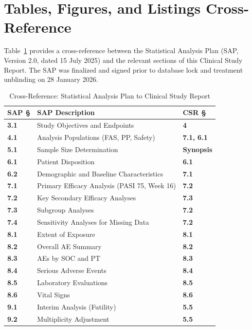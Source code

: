 \section{Tables, Figures, and Listings Cross-Reference}
\label{sec:saper}

Table~\ref{tab:saper} provides a cross-reference between the Statistical Analysis Plan (SAP, Version 2.0, dated 15 July 2025) and the relevant sections of this Clinical Study Report. The SAP was finalized and signed prior to database lock and treatment unblinding on 28 January 2026.

\vspace{4pt}
\begin{table}[H]
\centering
\caption{Cross-Reference: Statistical Analysis Plan to Clinical Study Report}
\label{tab:saper}
\small
\begin{tabularx}{\linewidth}{@{}>{\color{accent}\bfseries}l@{\hspace{6mm}}>{\raggedright\arraybackslash}X@{\hspace{6mm}}>{\bfseries}l@{}}
\toprule
\textbf{SAP \S} & \textbf{SAP Description} & \textbf{CSR \S} \\
\midrule
3.1   & Study Objectives and Endpoints             & 4 \\
4.1   & Analysis Populations (FAS, PP, Safety)     & 7.1, 6.1 \\
5.1   & Sample Size Determination                  & Synopsis \\
6.1   & Patient Disposition                        & 6.1 \\
6.2   & Demographic and Baseline Characteristics   & 7.1 \\
7.1   & Primary Efficacy Analysis (PASI 75, Week 16) & 7.2 \\
7.2   & Key Secondary Efficacy Analyses             & 7.3 \\
7.3   & Subgroup Analyses                           & 7.2 \\
7.4   & Sensitivity Analyses for Missing Data       & 7.2 \\
8.1   & Extent of Exposure                          & 8.1 \\
8.2   & Overall AE Summary                          & 8.2 \\
8.3   & AEs by SOC and PT                           & 8.3 \\
8.4   & Serious Adverse Events                      & 8.4 \\
8.5   & Laboratory Evaluations                      & 8.5 \\
8.6   & Vital Signs                                 & 8.6 \\
9.1   & Interim Analysis (Futility)                 & 5.5 \\
9.2   & Multiplicity Adjustment                     & 5.5 \\
\bottomrule
\end{tabularx}
\end{table}

